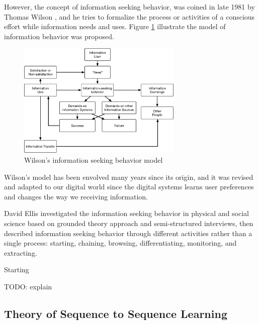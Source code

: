 However, the concept of information seeking behavior, was coined in late 1981 
by Thomas Wilson \cite{wilson1981user}, and he tries to formalize the process or activities of a conscious effort while information needs 
and uses. Figure \ref{fig:wilson-info-seek} illustrate the model of information behavior was proposed.

\begin{figure}[H]
    \centering
    \includegraphics[width=0.7\textwidth]{figures/wilson-info-behavior}
    \caption{Wilson's information seeking behavior model \cite{wilson1981user}}
    \label{fig:wilson-info-seek}
\end{figure}

Wilson's model has been envolved many years since its origin, and it was revised and adapted to our digital world since the digital systems learns user preferences and 
changes \cite{giannini1998receiving} the way we receiving information.

David Ellis investigated \cite{ellis1989behavioural} the information seeking behavior in physical and social science \cite{ellis1993comparison}
based on grounded theory approach \cite{aceto1994grounded} and semi-structured interviews, then described \cite{ellis1997modelling} information seeking behavior through different activities rather than a single process:
starting, chaining, browsing, differentiating, monitoring, and extracting.

Starting 

TODO: explain

\subsection{Theory of Sequence to Sequence Learning}



\cleardoublepage